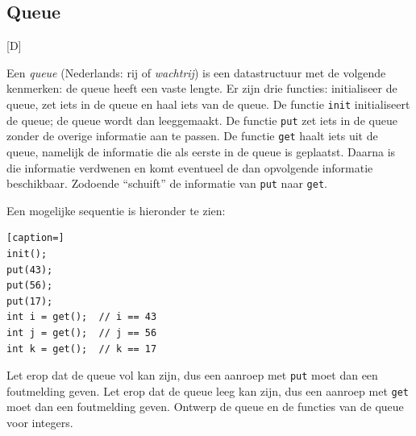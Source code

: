 \documentclass[a4paper,10pt,fleqn,twoside]{article}
\begin{document}
%
%

\subsection{Queue}[D]

Een \textsl{queue} (Nederlands: rij of \textsl{wachtrij}) is een datastructuur met de volgende kenmerken: de queue heeft een vaste lengte. Er zijn drie functies: initialiseer de queue, zet iets in de queue en haal iets van de queue. De functie \lstinline|init| initialiseert de queue; de queue wordt dan leeggemaakt. De functie \lstinline|put| zet iets in de queue zonder de overige informatie aan te passen. De functie \lstinline|get| haalt iets uit de queue, namelijk de informatie die als eerste in de queue is geplaatst. Daarna is die informatie verdwenen en komt eventueel de dan opvolgende informatie beschikbaar. Zodoende ``schuift'' de informatie van \lstinline|put| naar \lstinline|get|.

Een mogelijke sequentie is hieronder te zien:

\begin{lstlisting}[caption=]
init();
put(43);
put(56);
put(17);
int i = get();  // i == 43
int j = get();  // j == 56
int k = get();  // k == 17
\end{lstlisting}

Let erop dat de queue vol kan zijn, dus een aanroep met \lstinline|put| moet dan een foutmelding geven. Let erop dat de queue leeg kan zijn, dus een aanroep met \lstinline|get| moet dan een foutmelding geven.
Ontwerp de queue en de functies van de queue voor integers.
\end{document}
